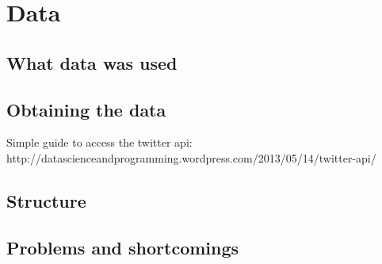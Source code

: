 \section{Data}

\subsection{What data was used}
\subsection{Obtaining the data}
Simple guide to access the twitter api:  http://datascienceandprogramming.wordpress.com/2013/05/14/twitter-api/


\subsection{Structure}
\subsection{Problems and shortcomings}
